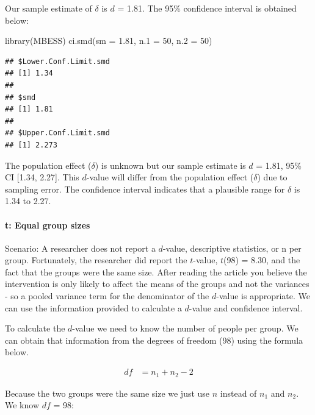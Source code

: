 \documentclass[
]{krantz}
\makeatletter
\newenvironment{Shaded}{\begin{snugshade}}{\end{snugshade}}
\newcommand{\AttributeTok}[1]{\textcolor[rgb]{0.61,0.61,0.61}{#1}}
\newcommand{\DecValTok}[1]{\textcolor[rgb]{0.06,0.06,0.06}{#1}}
\newcommand{\FloatTok}[1]{\textcolor[rgb]{0.06,0.06,0.06}{#1}}
\newcommand{\FunctionTok}[1]{\textcolor[rgb]{0,0,0}{#1}}
\newcommand{\NormalTok}[1]{#1}
\newenvironment{kframe}{%
\medskip{}
\setlength{\fboxsep}{.8em}
 \def\at@end@of@kframe{}%
 \ifinner\ifhmode%
  \def\at@end@of@kframe{\end{minipage}}%
  \begin{minipage}{\columnwidth}%
 \fi\fi%
 \def\FrameCommand##1{\hskip\@totalleftmargin \hskip-\fboxsep
 \colorbox{shadecolor}{##1}\hskip-\fboxsep
     \hskip-\linewidth \hskip-\@totalleftmargin \hskip\columnwidth}%
 \MakeFramed {\advance\hsize-\width
   \@totalleftmargin\z@ \linewidth\hsize
   \@setminipage}}%
 {\par\unskip\endMakeFramed%
 \at@end@of@kframe}
\renewenvironment{Shaded}{\begin{kframe}}{\end{kframe}}
\makeatother
\begin{document}
Our sample estimate of \(\delta\) is \(d\) = 1.81. The 95\% confidence interval is obtained below:

\begin{Shaded}
\begin{Highlighting}[]
\FunctionTok{library}\NormalTok{(MBESS)}
\FunctionTok{ci.smd}\NormalTok{(}\AttributeTok{sm =} \FloatTok{1.81}\NormalTok{, }\AttributeTok{n.1 =} \DecValTok{50}\NormalTok{, }\AttributeTok{n.2 =} \DecValTok{50}\NormalTok{) }
\end{Highlighting}
\end{Shaded}

\begin{verbatim}
## $Lower.Conf.Limit.smd
## [1] 1.34
## 
## $smd
## [1] 1.81
## 
## $Upper.Conf.Limit.smd
## [1] 2.273
\end{verbatim}

The population effect (\(\delta\)) is unknown but our sample estimate is \(d\) = 1.81, 95\% CI {[}1.34, 2.27{]}. This \(d\)-value will differ from the population effect (\(\delta\)) due to sampling error. The confidence interval indicates that a plausible range for \(\delta\) is 1.34 to 2.27.

\hypertarget{t-equal-group-sizes}{%
\paragraph{t: Equal group sizes}\label{t-equal-group-sizes}}

Scenario: A researcher does not report a \(d\)-value, descriptive statistics, or n per group. Fortunately, the researcher did report the \(t\)-value, \(t\)(98) = 8.30, and the fact that the groups were the same size. After reading the article you believe the intervention is only likely to affect the means of the groups and not the variances - so a pooled variance term for the denominator of the \(d\)-value is appropriate. We can use the information provided to calculate a \(d\)-value and confidence interval.

To calculate the \(d\)-value we need to know the number of people per group. We can obtain that information from the degrees of freedom (98) using the formula below.

\[
\begin{aligned}
df &= n_1 + n_2 - 2
\end{aligned}
\]

Because the two groups were the same size we just use \(n\) instead of \(n_1\) and \(n_2\). We know \(df\) = 98:
\end{document}

